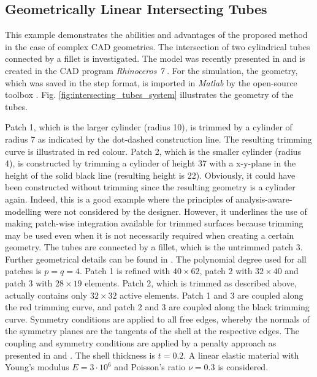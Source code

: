 \documentclass[3p]{elsarticle}
\begin{document}
\subsection{Geometrically Linear Intersecting Tubes}\label{sec:intersecting_tubes}
This example demonstrates the abilities and advantages of the proposed method in the case of complex CAD geometries. The intersection of two cylindrical tubes connected by a fillet is investigated. The model was recently presented in \cite{Proserpio2022} and is created in the CAD program \textit{Rhinoceros 7} \cite{Mcneel}. For the simulation, the geometry, which was saved in the step format, is imported in \textit{Matlab} \cite{Matlab} by the open-source toolbox \cite{Loibl2023}. Fig. \ref{fig:intersecting_tubes_system} illustrates the geometry of the tubes. 

Patch 1, which is the larger cylinder (radius 10), is trimmed by a cylinder of radius 7 as indicated by the dot-dashed construction line. The resulting trimming curve is illustrated in red colour. Patch 2, which is the smaller cylinder (radius 4), is constructed by trimming a cylinder of height 37 with a x-y-plane in the height of the solid black line (resulting height is 22). Obviously, it could have been constructed without trimming since the resulting geometry is a cylinder again. Indeed, this is a good example where the principles of analysis-aware-modelling were not considered by the designer. However, it underlines the use of making patch-wise integration available for trimmed surfaces because trimming may be used even when it is not necessarily required when creating a certain geometry. The tubes are connected by a fillet, which is the untrimmed patch 3. Further geometrical details can be found in \cite{Proserpio2022}. The polynomial degree used for all patches is $p=q=4$. Patch 1 is refined with $40 \times 62$, patch 2 with $32 \times 40$ and patch 3 with $28 \times 19$ elements. Patch 2, which is trimmed as described above, actually contains only $32 \times 32$ active elements. Patch 1 and 3 are coupled along the red trimming curve, and patch 2 and 3 are coupled along the black trimming curve. Symmetry conditions are applied to all free edges, whereby the normals of the symmetry planes are the tangents of the shell at the respective edges. The coupling and symmetry conditions are applied by a penalty approach as presented in \cite{Proserpio2022} and \cite{Herrema2019}. The shell thickness is $t=0.2$. A linear elastic material with Young's modulus $E=3\cdot10^6$ and Poisson's ratio $\nu=0.3$ is considered. \bigskip
\end{document}
